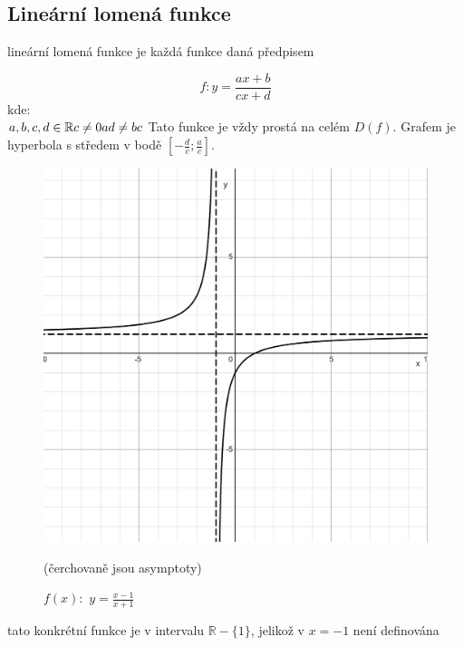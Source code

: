 \subsection{Lineární lomená funkce}
lineární lomená funkce je každá funkce daná předpisem 

$$
f: y=\frac{ax + b}{cx+d}
$$
kde: \\ $a,b,c,d \in \mathbb{R} \\ c \neq 0 \\ ad \neq bc$
Tato funkce je vždy prostá na celém $D(f)$. Grafem je hyperbola s středem v bodě $[-\frac{d}{c}; \frac{a}{c}]$.
\begin{figure}[H]
        \centering
        \includegraphics[width=0.5\linewidth]{img/2_lomena_fkce.png}
        \caption{$f(x):$ $y=\frac{x-1}{x+1}$} (čerchovaně jsou asymptoty)
        \label{fig:enter-label}
    \end{figure}

tato konkrétní funkce je v intervalu $\mathbb{R}-\{1\}$, jelikož v $x = -1$ není definována 
